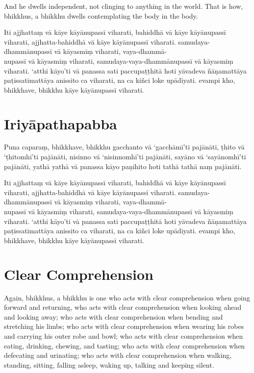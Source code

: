 And he dwells independent, not clinging to anything in the world. That is how,
bhikkhus, a bhikkhu dwells contemplating the body in the body.


\paliPage

Iti ajjhattaṃ vā kāye kāyānupassī viharati, bahiddhā vā kāye kāyānupassī
viharati, ajjhatta-bahiddhā vā kāye kāyānupassī viharati. samudaya-dhammānupassī
vā kāyasmiṃ viharati, vaya-dhammā-\\
nupassī vā kāyasmiṃ viharati, samudaya-vaya-dhammānupassī vā kāyasmiṃ viharati.
‘atthi kāyo’ti vā panassa sati paccupaṭṭhitā hoti yāvadeva ñāṇamattāya
paṭissatimattāya anissito ca viharati, na ca kiñci loke upādiyati. evampi kho,
bhikkhave, bhikkhu kāye kāyānupassī viharati.


\section*{Iriyāpathapabba}

Puna caparaṃ, bhikkhave, bhikkhu gacchanto vā ‘gacchāmī’ti pajānāti, ṭhito vā
‘ṭhitomhī’ti pajānāti, nisinno vā ‘nisinnomhī’ti pajānāti, sayāno vā
‘sayānomhī’ti pajānāti, yathā yathā vā panassa kāyo paṇihito hoti tathā tathā
naṃ pajānāti.

Iti ajjhattaṃ vā kāye kāyānupassī viharati, bahiddhā vā kāye kāyānupassī
viharati, ajjhatta-bahiddhā vā kāye kāyānupassī viharati. samudaya-dhammānupassī
vā kāyasmiṃ viharati, vaya-dhammā-\\
nupassī vā kāyasmiṃ viharati, samudaya-vaya-dhammānupassī vā kāyasmiṃ viharati.
‘atthi kāyo’ti vā panassa sati paccupaṭṭhitā hoti yāvadeva ñāṇamattāya
paṭissatimattāya anissito ca viharati, na ca kiñci loke upādiyati. evampi kho,
bhikkhave, bhikkhu kāye kāyānupassī viharati.


\englishPage
\section{Clear Comprehension}

Again, bhikkhus, a bhikkhu is one who acts with clear comprehension when going
forward and returning, who acts with clear comprehension when looking ahead and
looking away; who acts with clear comprehension when bending and stretching his
limbs; who acts with clear comprehension when wearing his robes and carrying his
outer robe and bowl; who acts with clear comprehension when eating, drinking,
chewing, and tasting; who acts with clear comprehension when defecating and
urinating; who acts with clear comprehension when walking, standing, sitting,
falling asleep, waking up, talking and keeping silent.

